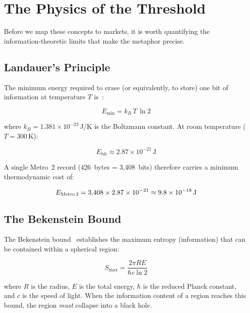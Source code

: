 \documentclass[11pt,twocolumn]{article}
\begin{document}
\section{The Physics of the Threshold}

Before we map these concepts to markets, it is worth quantifying the information-theoretic limits that make the metaphor precise.

\subsection{Landauer's Principle}

The minimum energy required to erase (or equivalently, to store) one bit of information at temperature $T$ is~\cite{landauer1961}:

\begin{equation}
E_{\min} = k_B \, T \, \ln 2
\label{eq:landauer}
\end{equation}

\noindent where $k_B = 1.381 \times 10^{-23}$\,J/K is the Boltzmann constant. At room temperature ($T = 300$\,K):

\begin{equation}
E_{\text{bit}} \approx 2.87 \times 10^{-21}\,\text{J}
\end{equation}

A single Metro~2 record (426~bytes = 3,408~bits) therefore carries a minimum thermodynamic cost of:

\begin{equation}
E_{\text{Metro\,2}} = 3{,}408 \times 2.87 \times 10^{-21} \approx 9.8 \times 10^{-18}\,\text{J}
\end{equation}

\subsection{The Bekenstein Bound}

The Bekenstein bound~\cite{bekenstein1981} establishes the maximum entropy (information) that can be contained within a spherical region:

\begin{equation}
S_{\max} = \frac{2 \pi R E}{\hbar c \ln 2}
\label{eq:bekenstein}
\end{equation}

\noindent where $R$ is the radius, $E$ is the total energy, $\hbar$ is the reduced Planck constant, and $c$ is the speed of light. When the information content of a region reaches this bound, the region \emph{must} collapse into a black hole.
\end{document}
